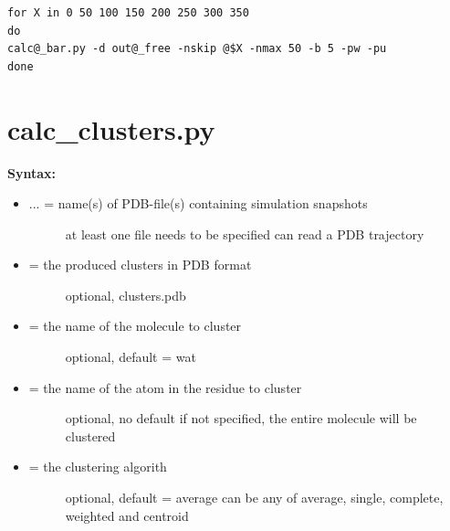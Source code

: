 \documentclass[letterpaper,10pt,english]{manual}
\begin{document}
\begin{Verbatim}[commandchars=@\[\]]
for X in 0 50 100 150 200 250 300 350
do
calc@_bar.py -d out@_free -nskip @$X -nmax 50 -b 5 -pw -pu
done
\end{Verbatim}


\section{calc\_clusters.py}

\textbf{Syntax:}

\begin{itemize}
\item {} \begin{description}
\item[{ ... = name(s) of PDB-file(s) containing simulation snapshots}] \leavevmode
at least one file needs to be specified
can read a PDB trajectory

\end{description}

\item {} \begin{description}
\item[{ = the produced clusters in PDB format}] \leavevmode
optional, clusters.pdb

\end{description}

\item {} \begin{description}
\item[{ = the name of the molecule to cluster}] \leavevmode
optional, default = wat

\end{description}

\item {} \begin{description}
\item[{ = the name of the atom in the residue to cluster}] \leavevmode
optional, no default
if not specified, the entire molecule will be clustered

\end{description}

\item {} \begin{description}
\item[{ = the clustering algorith}] \leavevmode
optional, default = average
can be any of average, single, complete, weighted and centroid


\end{description}
\end{itemize}
\end{document}
